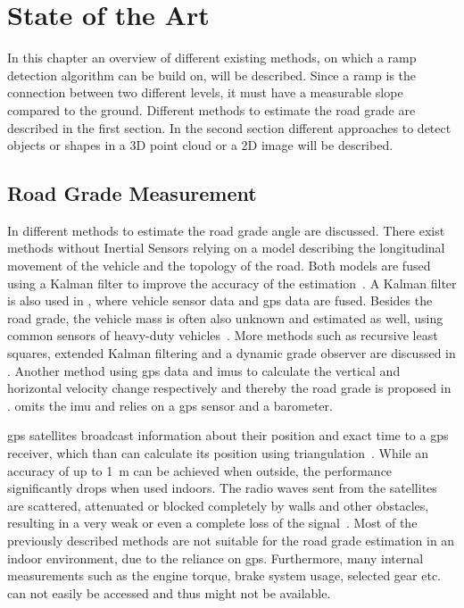 \chapter{State of the Art}
\label{ch:StateOfTheArt}

In this chapter an overview of different existing methods, on which a ramp detection algorithm can be build on, will be described.
Since a ramp is the connection between two different levels, it must have a measurable slope compared to the ground.
Different methods to estimate the road grade are described in the first section.
In the second section different approaches to detect objects or shapes in a 3D point cloud or a 2D image will be described.


\section{Road Grade Measurement}
In \cite{Jauch2018} different methods to estimate the road grade angle are discussed.
There exist methods without Inertial Sensors relying on a model describing the longitudinal movement of the vehicle and the topology of the road.
Both models are fused using a Kalman filter to improve the accuracy of the estimation~\cite{Sahlholm2007}.
A Kalman filter is also used in \cite{Sahlholm2010}, where vehicle sensor data and \gls{gps} data are fused.
Besides the road grade, the vehicle mass is often also unknown and estimated as well, using common sensors of heavy-duty vehicles~\cite{Sahlholm2010, Maleej2014}.
More methods such as recursive least squares, extended Kalman filtering and a dynamic grade observer are discussed in \cite{Kidambi2014}.
Another method using \gls{gps} data and \glspl{imu} to calculate the vertical and horizontal velocity change respectively and thereby the road grade is proposed in \cite{Ryu2004}.
\cite{YazdaniBoroujeni2014} omits the \gls{imu} and relies on a \gls{gps} sensor and a barometer.

\gls{gps} satellites broadcast information about their position and exact time to a \gls{gps} receiver, which than can calculate its position using triangulation~\cite{Mainetti2014}.
While an accuracy of up to \SI{1}{\metre} can be achieved when outside, the performance significantly drops when used indoors.
The radio waves sent from the satellites are scattered, attenuated or blocked completely by walls and other obstacles, resulting in a very weak or even a complete loss of the signal~\cite{Ozdenizci2015}.
Most of the previously described methods are not suitable for the road grade estimation in an indoor environment, due to the reliance on \gls{gps}.
Furthermore, many internal measurements such as the engine torque, brake system usage, selected gear etc. can not easily be accessed and thus might not be available.


